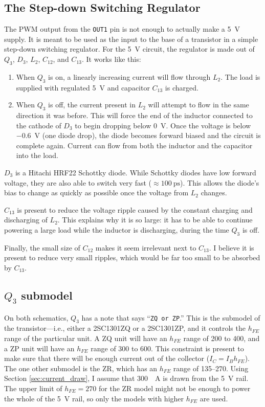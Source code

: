 \documentclass{article}
\newcommand{\chippin}{\texttt}
\newcommand{\model}{\textsf}
\begin{document}
\subsection{The Step-down Switching Regulator}
\label{sec:step-down_regulator}
The PWM output from the \chippin{OUT1} pin is not enough to actually
make a \qty{5}{\volt} supply. It is meant to be used as the input to
the base of a transistor in a simple step-down switching
regulator. For the \qty{5}{\volt} circuit, the regulator is made out
of $Q_3$, $D_3$, $L_2$, $C_{12}$, and $C_{13}$. It works like this:

\begin{enumerate}
\item When $Q_3$ is on, a linearly increasing current will flow
  through $L_2$. The load is supplied with regulated \qty{5}{\volt}
  and capacitor $C_{13}$ is charged.
\item When $Q_3$ is off, the current present in $L_2$ will attempt to
  flow in the same direction it was before. This will force the end of
  the inductor connected to the cathode of $D_3$ to begin dropping
  below \qty{0}{\volt}. Once the voltage is below \qty{-0.6}{\volt}
  (one diode drop), the diode becomes forward biased and the circuit
  is complete again. Current can flow from both the inductor and the
  capacitor into the load.
\end{enumerate}

$D_3$ is a Hitachi \model{HRF22} Schottky diode. While Schottky diodes
have low forward voltage, they are also able to switch very fast
($\approx{}\qty{100}{\pico\second}$). This allows the diode's bias to
change as quickly as possible once the voltage from $L_2$ changes.

$C_{13}$ is present to reduce the voltage ripple caused by the
constant charging and discharging of $L_2$. This explains why it is so
large: it has to be able to continue powering a large load while the
inductor is discharging, during the time $Q_3$ is off.

Finally, the small size of $C_{12}$ makes it seem irrelevant next to
$C_{13}$. I believe it is present to reduce very small ripples, which
would be far too small to be absorbed by $C_{13}$.

\subsection{$Q_3$ submodel}
\label{sec:q3_submodel}
On both schematics, $Q_3$ has a note that says ``\texttt{ZQ or ZP}.''
This is the submodel of the transistor---i.e., either a
\model{2SC1301ZQ} or a \model{2SC1301ZP}, and it controls the $h_{FE}$
range of the particular unit. A \model{ZQ} unit will have an $h_{FE}$
range of 200 to 400, and a \model{ZP} unit will have an $h_{FE}$
range of 300 to 600. This constraint is present to make sure that
there will be enough current out of the collector ($I_C =
I_Bh_{FE}$). The one other submodel is the \model{ZR}, which has an
$h_{FE}$ range of 135--270. Using Section \ref{sec:current_draw}, I
assume that \qty{300}{\milli{}A} is drawn from the \qty{5}{\volt}
rail. The upper limit of $h_{FE} = 270$ for the \model{ZR} model
might not be enough to power the whole of the \qty{5}{\volt} rail, so
only the models with higher $h_{FE}$ are used.
\end{document}
